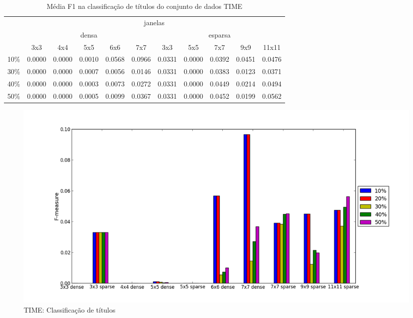 \documentclass[a4paper,11pt]{article}
\begin{document}
  \begin{center}
    \begin{table}[p]
      \caption{Média F1 na classificação de títulos do conjunto de dados TIME}
      \begin{tabular}{ l | c c c c c || c c c c c | }
        \cline{2-11}
        & \multicolumn{10}{|c|}{janelas} \\
        \cline{2-11}
        & \multicolumn{5}{c||}{densa} & \multicolumn{5}{c|}{esparsa} \\
        \cline{2-11}
        & 3x3 & 4x4 & 5x5 & 6x6 & 7x7 & 3x3 & 5x5 & 7x7 & 9x9 & 11x11 \\
        \hline
        \multicolumn{1}{|l|}{10\%}& 0.0000& 0.0000& 0.0010& 0.0568& 0.0966& 0.0331& 0.0000& 0.0392& 0.0451& 0.0476\\
        \multicolumn{1}{|l|}{30\%}& 0.0000& 0.0000& 0.0007& 0.0056& 0.0146& 0.0331& 0.0000& 0.0383& 0.0123& 0.0371\\
        \multicolumn{1}{|l|}{40\%}& 0.0000& 0.0000& 0.0003& 0.0073& 0.0272& 0.0331& 0.0000& 0.0449& 0.0214& 0.0494\\
        \multicolumn{1}{|l|}{50\%}& 0.0000& 0.0000& 0.0005& 0.0099& 0.0367& 0.0331& 0.0000& 0.0452& 0.0199& 0.0562\\
        \hline  
      \end{tabular}
    \end{table}
  \end{center}

  \begin{figure}[p]
    \centerline{\includegraphics[width=1.2\textwidth]{assets/experiment_charts/time_TextRegion_heading_f1.png}}
    \caption{TIME: Classificação de títulos}
    \label{fig:time_TextRegion_heading_f1}
  \end{figure}
\end{document}
